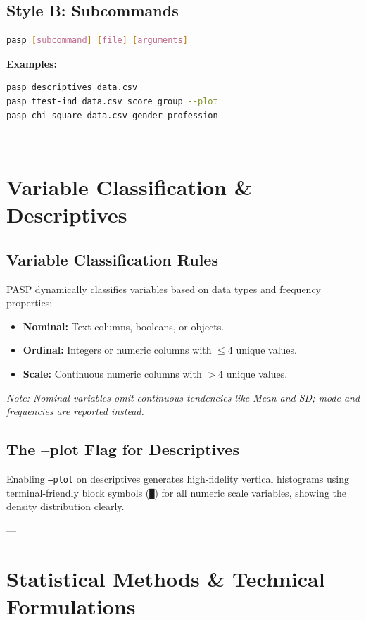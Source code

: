 \documentclass[a4paper,11pt,oneside]{article}
\begin{document}
\subsection{Style B: Subcommands}
\begin{lstlisting}[language=bash]
pasp [subcommand] [file] [arguments]
\end{lstlisting}
\textbf{Examples:}
\begin{lstlisting}[language=bash]
pasp descriptives data.csv
pasp ttest-ind data.csv score group --plot
pasp chi-square data.csv gender profession
\end{lstlisting}

---

\section{Variable Classification \& Descriptives}

\subsection{Variable Classification Rules}
PASP dynamically classifies variables based on data types and frequency properties:
\begin{itemize}
    \item \textbf{Nominal:} Text columns, booleans, or objects.
    \item \textbf{Ordinal:} Integers or numeric columns with $\leq 4$ unique values.
    \item \textbf{Scale:} Continuous numeric columns with $> 4$ unique values.
\end{itemize}
\emph{Note: Nominal variables omit continuous tendencies like Mean and SD; mode and frequencies are reported instead.}

\subsection{The --plot Flag for Descriptives}
Enabling \texttt{--plot} on descriptives generates high-fidelity vertical histograms using terminal-friendly block symbols (\texttt{█}) for all numeric scale variables, showing the density distribution clearly.

---

\section{Statistical Methods \& Technical Formulations}
\end{document}
